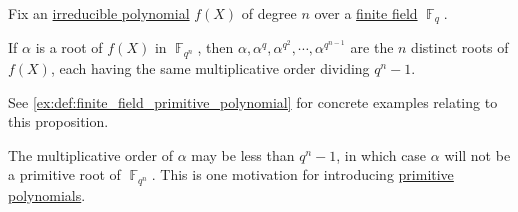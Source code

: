 \begin{proposition}\label{thm:irreducible_polynomial_over_finite_field}
  Fix an \hyperref[def:domain_divisibility/irreducible]{irreducible polynomial} \( f(X) \) of degree \( n \) over a \hyperref[def:finite_field]{finite field} \( \BbbF_q \).

  If \( \alpha \) is a root of \( f(X) \) in \( \BbbF_{q^n} \), then \( \alpha, \alpha^q, \alpha^{q^2}, \cdots, \alpha^{q^{n-1}} \) are the \( n \) distinct roots of \( f(X) \), each having the same multiplicative order dividing \( q^n - 1 \).
\end{proposition}
\begin{comments}
  \item See \cref{ex:def:finite_field_primitive_polynomial} for concrete examples relating to this proposition.
  \item The multiplicative order of \( \alpha \) may be less than \( q^n - 1 \), in which case \( \alpha \) will not be a primitive root of \( \BbbF_{q^n} \). This is one motivation for introducing \hyperref[def:finite_field_primitive_polynomial]{primitive polynomials}.
\end{comments}

